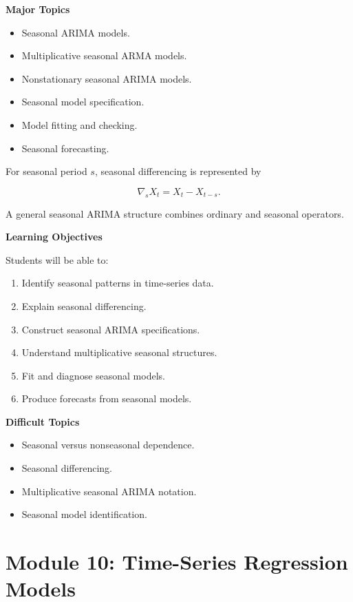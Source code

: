 \documentclass[11pt,a4paper]{article}
\begin{document}
\textbf{Major Topics}

\begin{itemize}
    \item Seasonal ARIMA models.
    \item Multiplicative seasonal ARMA models.
    \item Nonstationary seasonal ARIMA models.
    \item Seasonal model specification.
    \item Model fitting and checking.
    \item Seasonal forecasting.
\end{itemize}

For seasonal period $s$, seasonal differencing is represented by

\[
\nabla_s X_t
=
X_t-X_{t-s}.
\]

A general seasonal ARIMA structure combines ordinary and seasonal operators.

\textbf{Learning Objectives}

Students will be able to:

\begin{enumerate}
    \item Identify seasonal patterns in time-series data.
    \item Explain seasonal differencing.
    \item Construct seasonal ARIMA specifications.
    \item Understand multiplicative seasonal structures.
    \item Fit and diagnose seasonal models.
    \item Produce forecasts from seasonal models.
\end{enumerate}

\textbf{Difficult Topics}

\begin{itemize}
    \item Seasonal versus nonseasonal dependence.
    \item Seasonal differencing.
    \item Multiplicative seasonal ARIMA notation.
    \item Seasonal model identification.
\end{itemize}

\section{Module 10: Time-Series Regression Models}
\end{document}
